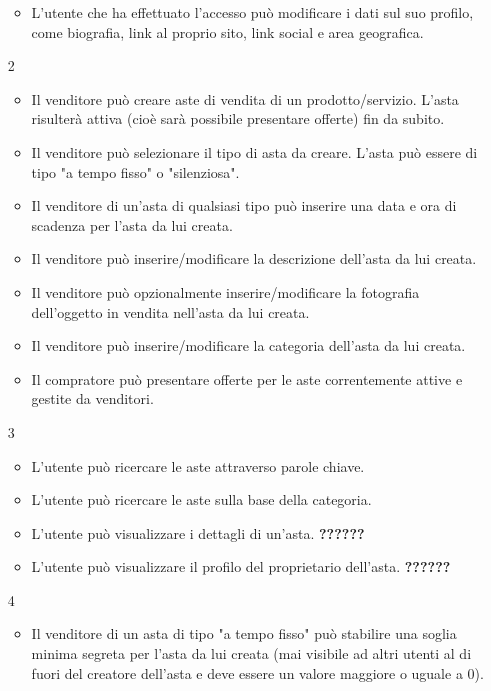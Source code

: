 \begin{itemize}
\begin{itemize}
                    \item L'utente che ha effettuato l'accesso può modificare i dati sul suo profilo, come biografia, link al proprio sito, link social e area geografica.
                \end{itemize}
            \item[2] 
                \begin{itemize}
                    \item Il venditore può creare aste di vendita di un prodotto/servizio. L'asta risulterà attiva (cioè sarà possibile presentare offerte) fin da subito.
                    \item Il venditore può selezionare il tipo di asta da creare. L'asta può essere di tipo "a tempo fisso" o "silenziosa".
                    \item Il venditore di un'asta di qualsiasi tipo può inserire una data e ora di scadenza per l'asta da lui creata.
                    \item Il venditore può inserire/modificare la descrizione dell'asta da lui creata.
                    \item Il venditore può opzionalmente inserire/modificare la fotografia dell'oggetto in vendita nell'asta da lui creata.
                    \item Il venditore può inserire/modificare la categoria dell'asta da lui creata.
                    \item Il compratore può presentare offerte per le aste correntemente attive e gestite da venditori.
                \end{itemize}
            \item[3]
                \begin{itemize}
                    \item L'utente può ricercare le aste attraverso parole chiave.
                    \item L'utente può ricercare le aste sulla base della categoria.
                    \item L'utente può visualizzare i dettagli di un'asta. \textbf{??????}
                    \item L'utente può visualizzare il profilo del proprietario dell'asta. \textbf{??????}
                \end{itemize}
            \item[4]
                \begin{itemize}
                    \item Il venditore di un asta di tipo "a tempo fisso" può stabilire una soglia minima segreta per l'asta da lui creata (mai visibile ad altri utenti al di fuori del creatore dell'asta e deve essere un valore maggiore o uguale a 0).

\end{itemize}
\end{itemize}
